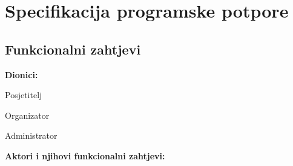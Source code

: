 \chapter{Specifikacija programske potpore}
		
			
		
	\section{Funkcionalni zahtjevi}
			
			
			
				
			
			
			\noindent \textbf{Dionici:}
			
			\begin{packed_enum}
				
				\item Posjetitelj
				\item Organizator			
				\item Administrator
				
			\end{packed_enum}
			
			\noindent \textbf{Aktori i njihovi funkcionalni zahtjevi:}
			
